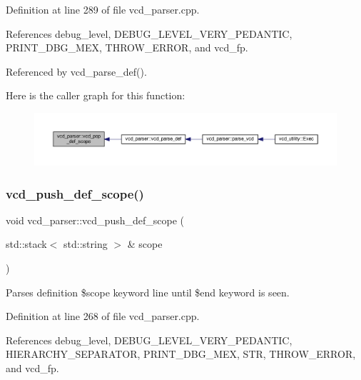 Definition at line 289 of file vcd\+\_\+parser.\+cpp.



References debug\+\_\+level, D\+E\+B\+U\+G\+\_\+\+L\+E\+V\+E\+L\+\_\+\+V\+E\+R\+Y\+\_\+\+P\+E\+D\+A\+N\+T\+IC, P\+R\+I\+N\+T\+\_\+\+D\+B\+G\+\_\+\+M\+EX, T\+H\+R\+O\+W\+\_\+\+E\+R\+R\+OR, and vcd\+\_\+fp.



Referenced by vcd\+\_\+parse\+\_\+def().

Here is the caller graph for this function\+:
\nopagebreak
\begin{figure}[H]
\begin{center}
\leavevmode
\includegraphics[width=350pt]{d2/d25/classvcd__parser_a59e4c34514e6722d541aa013d02eaa32_icgraph}
\end{center}
\end{figure}
\mbox{\label{classvcd__parser_a94636524ca1126b352560c72b646a8cc}} 
\subsubsection{\texorpdfstring{vcd\+\_\+push\+\_\+def\+\_\+scope()}{vcd\_push\_def\_scope()}}
{\footnotesize\ttfamily void vcd\+\_\+parser\+::vcd\+\_\+push\+\_\+def\+\_\+scope (\begin{DoxyParamCaption}\item[{std\+::stack$<$ std\+::string $>$ \&}]{scope }\end{DoxyParamCaption})\hspace{0.3cm}{\ttfamily [private]}}



Parses definition \$scope keyword line until \$end keyword is seen. 



Definition at line 268 of file vcd\+\_\+parser.\+cpp.



References debug\+\_\+level, D\+E\+B\+U\+G\+\_\+\+L\+E\+V\+E\+L\+\_\+\+V\+E\+R\+Y\+\_\+\+P\+E\+D\+A\+N\+T\+IC, H\+I\+E\+R\+A\+R\+C\+H\+Y\+\_\+\+S\+E\+P\+A\+R\+A\+T\+OR, P\+R\+I\+N\+T\+\_\+\+D\+B\+G\+\_\+\+M\+EX, S\+TR, T\+H\+R\+O\+W\+\_\+\+E\+R\+R\+OR, and vcd\+\_\+fp.



